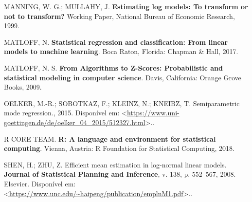 \documentclass[a4paper, 12pt]{article}
\begin{document}
\hypertarget{ref-NBERt0246}{}
MANNING, W. G.; MULLAHY, J. \textbf{Estimating log models: To transform
or not to transform?} Working Paper, National Bureau of Economic
Research, 1999.

\hypertarget{ref-matloff2017}{}
MATLOFF, N. \textbf{Statistical regression and classification: From
linear models to machine learning}. Boca Raton, Florida: Chapman \&
Hall, 2017.

\hypertarget{ref-matloff2009}{}
MATLOFF, N. S. \textbf{From Algorithms to Z-Scores: Probabilistic and
statistical modeling in computer science}. Davis, California: Orange
Grove Books, 2009.

\hypertarget{ref-oelker}{}
OELKER, M.-R.; SOBOTKAZ, F.; KLEINZ, N.; KNEIBZ, T. Semiparametric mode
regression., 2015. Disponível em:
\textless{}\url{https://www.uni-goettingen.de/de/oelker_04_2015/512327.html}\textgreater{}..

\hypertarget{ref-R}{}
R CORE TEAM. \textbf{R: A language and environment for statistical
computing}. Vienna, Austria: R Foundation for Statistical Computing,
2018.

\hypertarget{ref-shen}{}
SHEN, H.; ZHU, Z. Efficient mean estimation in log-normal linear models.
\textbf{Journal of Statistical Planning and Inference}, v. 138, p.
552--567, 2008. Elsevier. Disponível em:
\textless{}\url{https://www.unc.edu/~haipeng/publication/emplnM1.pdf}\textgreater{}..
\end{document}
